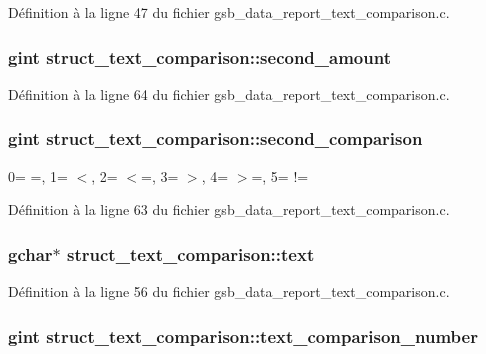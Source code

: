 Définition à la ligne 47 du fichier gsb\_\-data\_\-report\_\-text\_\-comparison.c.

\subsubsection[{second\_\-amount}]{\setlength{\rightskip}{0pt plus 5cm}gint {\bf struct\_\-text\_\-comparison::second\_\-amount}}\label{structstruct__text__comparison_a6ada0c1c90928549f353054d9cebecce}


Définition à la ligne 64 du fichier gsb\_\-data\_\-report\_\-text\_\-comparison.c.

\subsubsection[{second\_\-comparison}]{\setlength{\rightskip}{0pt plus 5cm}gint {\bf struct\_\-text\_\-comparison::second\_\-comparison}}\label{structstruct__text__comparison_a679b56f92595d50f15ca2421498c787c}
0= =, 1= $<$, 2= $<$=, 3= $>$, 4= $>$=, 5= != 

Définition à la ligne 63 du fichier gsb\_\-data\_\-report\_\-text\_\-comparison.c.

\subsubsection[{text}]{\setlength{\rightskip}{0pt plus 5cm}gchar$\ast$ {\bf struct\_\-text\_\-comparison::text}}\label{structstruct__text__comparison_a42ab5aaa4cf9fdf039f8db7710a3a313}


Définition à la ligne 56 du fichier gsb\_\-data\_\-report\_\-text\_\-comparison.c.

\subsubsection[{text\_\-comparison\_\-number}]{\setlength{\rightskip}{0pt plus 5cm}gint {\bf struct\_\-text\_\-comparison::text\_\-comparison\_\-number}}\label{structstruct__text__comparison_a71f9aa4879f527adb4c15910f090cfbd}


